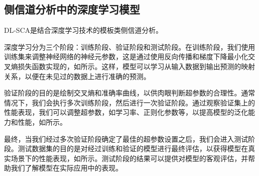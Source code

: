 {%
%	
	
	\subsection{侧信道分析中的深度学习模型}\label{subs:conceptdlsca}
	
	DL-SCA是结合深度学习技术的模板类侧信道分析。
	
	
	深度学习分为三个阶段：训练阶段、验证阶段和测试阶段。在训练阶段，我们使用训练集来调整神经网络的神经元参数，这是通过使用反向传播和梯度下降最小化交叉熵损失函数实现的，如所示。这样，模型可以学习从输入数据到输出预测的映射关系，以便在未见过的数据上进行准确的预测。
	
	验证阶段的目的是绘制交叉熵和准确率曲线，以供肉眼判断超参数的合理性。通常情况下，我们会执行多次训练阶段，然后进行一次验证阶段。通过观察验证集上的性能表现，我们可以调整超参数，如学习率、正则化参数等，以提高模型的泛化能力和性能，如所示。
	
	最终，当我们经过多次验证阶段确定了最佳的超参数设置之后，我们会进入测试阶段。测试数据集的目的是对经过训练和验证的模型进行最终评估，以获得模型在真实场景下的性能表现，如所示。测试阶段的结果可以提供对模型的客观评估，并帮助我们了解模型在实际应用中的表现。
	
}
